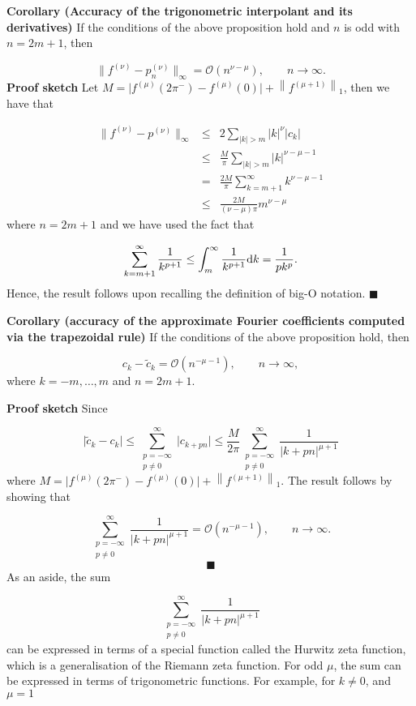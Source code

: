 \documentclass[12pt,a4paper]{article}
\begin{document}
\textbf{Corollary (Accuracy of the trigonometric interpolant and its derivatives)}  If the conditions of the above proposition hold and $n$ is odd with $n = 2m + 1$, then

\[
\| f^{(\nu)} - p_n^{(\nu)} \|_{\infty} = \mathcal{O}(n^{\nu-\mu}), \qquad n \to \infty.
\]
\textbf{Proof sketch} Let $M  = \vert f^{(\mu)}(2\pi^{-}) - f^{(\mu)}(0)   \vert + \left\|f^{(\mu+1)}   \right\|_1$, then we have that


\begin{eqnarray*}
\| f^{(\nu)} - p^{(\nu)}  \|_{\infty} & \leq  & 2\sum_{\vert k \vert > m} \vert k \vert^{\nu} \vert c_k \vert  \\
& \leq & \frac{M}{\pi } \sum_{\vert k \vert > m} \vert k \vert^{\nu-\mu-1} \\
& = & \frac{2M}{\pi } \sum_{ k = m+1}^{\infty}  k^{\nu-\mu-1} \\
& \leq & \frac{2M}{(\nu-\mu)\pi  } m^{\nu-\mu}
\end{eqnarray*}
where $n = 2m + 1$ and we have used the fact that

\[
\sum_{k = m+1}^{\infty}  \frac{1}{k^{p+1}}  \leq \int_{m}^{\infty} \frac{1}{k^{p+1}}{\rm d}k = \frac{1}{pk^p}.
\]
Hence, the result follows upon recalling the definition of big-O notation.   $\blacksquare$

\textbf{Corollary (accuracy of the approximate Fourier coefficients computed via the trapezoidal rule)} If the conditions of the above proposition hold, then

\[
c_k - \widetilde{c}_{k} = \mathcal{O}\left( n^{-\mu-1} \right), \qquad n \to \infty,
\]
where $k = -m, \ldots, m$ and $n = 2m + 1$.

\textbf{Proof sketch} Since

\[
\vert \widetilde{c}_k - c_k \vert \leq  \sum_{\substack{p=-\infty\\ p\neq 0}}^{\infty} \vert c_{k+pn} \vert \leq  \frac{M}{2\pi} \sum_{\substack{p=-\infty\\ p\neq 0}}^{\infty}  \frac{1}{\vert k + pn \vert^{\mu+1}}
\]
where $M  = \vert f^{(\mu)}(2\pi^{-}) - f^{(\mu)}(0)   \vert + \left\|f^{(\mu+1)}   \right\|_1$.  The result follows by showing that

\[
\sum_{\substack{p=-\infty\\ p\neq 0}}^{\infty}  \frac{1}{\vert k + pn \vert^{\mu+1}} = \mathcal{O}(n^{-\mu-1}), \qquad n \to \infty.
\]
\[
\blacksquare
\]
As an aside, the sum 

\[
\sum_{\substack{p=-\infty\\ p\neq 0}}^{\infty}  \frac{1}{\vert k + pn \vert^{\mu+1}}
\]
can be expressed in terms of a special function called the Hurwitz zeta function, which is a generalisation of the Riemann zeta function.  For odd $\mu$, the sum can be expressed in terms of trigonometric functions.  For example, for $k \neq 0$, and $\mu = 1$
\end{document}
